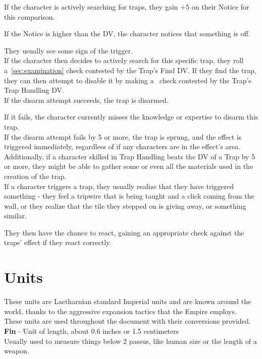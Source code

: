 If the character is actively searching for traps, they gain +5 on their Notice for this comparison.

If the Notice is higher than the DV, the character notices that something is off.

They usually see some sign of the trigger.\\
If the character then decides to actively search for this specific trap, they roll a~\ref{sec:examination} check contested by the Trap's Find DV.
If they find the trap, they can then attempt to disable it by making a~ check contested by the Trap's Trap Handling DV.\\
If the disarm attempt succeeds, the trap is disarmed.

If it fails, the character currently misses the knowledge or expertise to disarm this trap.\\
If the disarm attempt fails by 5 or more, the trap is sprung, and the effect is triggered immediately, regardless of if any characters are in the effect's area.\\
Additionally, if a character skilled in Trap Handling beats the DV of a Trap by 5 or more, they might be able to gather some or even all the materials used in the creation of the trap.\\
If a character triggers a trap, they usually realize that they have triggered something - they feel a tripwire that is being taught and a click coming from the wall, or they realize that the tile they stepped on is giving away, or something similar.

They then have the chance to react, gaining an appropriate check against the traps' effect if they react correctly.\\

\section{Units}\label{sec:units}
These units are Laetharnian standard Imperial units and are known around the world, thanks to the aggressive expansion tactics that the Empire employs.\\
These units are used throughout the document with their conversions provided.\\


\textbf{Fin} - Unit of length, about 0.6 inches or 1.5 centimeters\\
Usually used to measure things below 2 passus, like human size or the length of a weapon.\\


